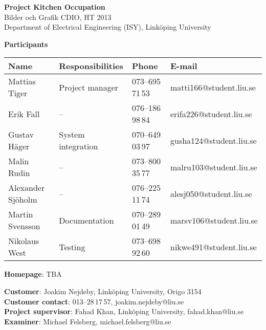 \begin{center}
    \vspace*{4\baselineskip}

	\textbf{\huge Project Kitchen Occupation} \\
	\vspace*{0.5\baselineskip}
	Bilder och Grafik CDIO, HT 2013 \\
	Department of Electrical Engineering (ISY), Link\"{o}ping University
	
	\vspace*{2\baselineskip}
	\textbf{\LARGE Participants}


	{\footnotesize 
	\begin{tabular}{|p{2.7cm}|p{5cm}|p{2cm}|p{3.4cm}|}
		\hline
		\textbf{Name} & \textbf{Responsibilities} & \textbf{Phone} & \textbf{E-mail} \\
		\hline
		Mattias Tiger & Project manager & 073--695\,71\,53 & matti166@student.liu.se \\
		\hline
		Erik Fall & -- & 076--186\,98\,84 & erifa226@student.liu.se \\
		\hline
		Gustav Häger & System integration & 070--649\,03\,97 & gusha124@student.liu.se \\
		\hline
		Malin Rudin & -- & 073--800\,35\,77 & malru103@student.liu.se \\
		\hline
		Alexander Sjöholm & -- & 076--225\,11\,74 & alesj050@student.liu.se \\
		\hline
		Martin Svensson & Documentation & 070--289\,01\,49 & marsv106@student.liu.se \\
		\hline
		Nikolaus West & Testing & 073--698\,92\,60 & nikwe491@student.liu.se \\
		\hline
	\end{tabular}
	}

{\footnotesize 
\vspace{0.5\baselineskip}
\textbf{Homepage}: TBA \\
\vspace{1\baselineskip}

\textbf{Customer}: Joakim Nejdeby, Link\"{o}ping University, Origo 3154 \\
\textbf{Customer contact}: 013--28\,17\,57, joakim.nejdeby@liu.se \\
\textbf{Project supervisor}: Fahad Khan, Link\"{o}ping University, fahad.khan@liu.se \\
\textbf{Examiner}: Michael Felsberg, michael.felsberg@liu.se \\
}

\end{center}
